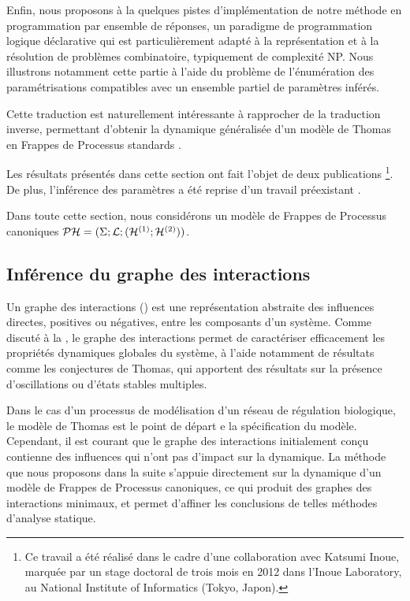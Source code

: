 Enfin, nous proposons à la  quelques pistes d'implémentation
de notre méthode en programmation par ensemble de réponses,
un paradigme de programmation logique déclarative qui est particulièrement
adapté à la représentation et à la résolution de problèmes combinatoire,
typiquement de complexité NP.
Nous illustrons notamment cette partie à l'aide du problème de l'énumération des paramétrisations
compatibles avec un ensemble partiel de paramètres inférés.

Cette traduction est naturellement intéressante à rapprocher de la traduction inverse,
permettant d'obtenir la dynamique généralisée d'un modèle de Thomas
en Frappes de Processus standards \cite[p.~176]{PMR10-TCSB}.

\myskip

Les résultats présentés dans cette section
ont fait l'objet de deux publications \cite*{FPIMR12-CMSB,FPIMR12-LDSSB}%
\footnote{Ce travail a été réalisé dans le cadre d'une collaboration avec Katsumi Inoue,
marquée par un stage doctoral de trois mois en 2012 dans l'Inoue Laboratory,
au National Institute of Informatics (Tokyo, Japon).}.
De plus, l'inférence des paramètres a été reprise d'un travail préexistant
\cite{PMR10-TCSB}.

\myskip

Dans toute cette section, nous considérons un modèle de Frappes de Processus canoniques
$\mathcal{PH} = (\Sigma; \mathcal{L}; (\mathcal{H}^{(1)}; \mathcal{H}^{(2)}))$.

\subsection{Inférence du graphe des interactions}

Un graphe des interactions () est une représentation abstraite des
influences directes, positives ou négatives, entre les composants d'un système.
Comme discuté à la , le graphe des interactions permet
de caractériser efficacement les propriétés dynamiques globales du système,
à l'aide notamment de résultats comme les conjectures de Thomas,
qui apportent des résultats sur la présence d'oscillations ou d'états stables multiples.

Dans le cas d'un processus de modélisation d'un réseau de régulation biologique, le modèle
de Thomas est le point de départ e la spécification du modèle.
Cependant, il est courant que le graphe des interactions initialement conçu contienne des
influences qui n'ont pas d'impact sur la dynamique.
La méthode que nous proposons dans la suite s'appuie directement sur la dynamique d'un modèle
de Frappes de Processus canoniques, ce qui produit des graphes des interactions minimaux,
et permet d'affiner les conclusions de telles méthodes d'analyse statique.

